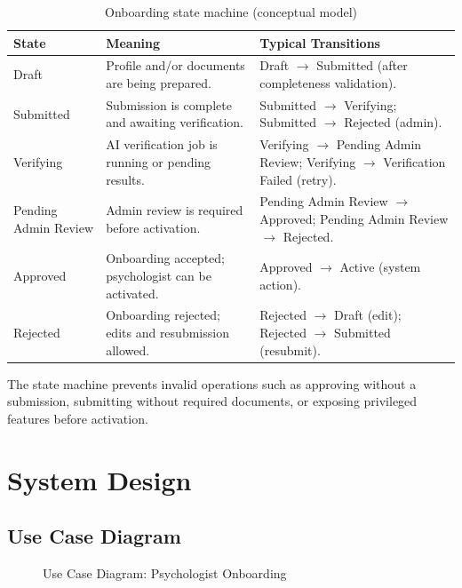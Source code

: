 \begin{table}[H]
\centering
\begin{tabularx}{\textwidth}{|l|X|X|}
\hline
\rowcolor{medgray}
\textbf{State} & \textbf{Meaning} & \textbf{Typical Transitions} \\
\hline

Draft & Profile and/or documents are being prepared. &
Draft $\rightarrow$ Submitted (after completeness validation). \\ \hline

Submitted & Submission is complete and awaiting verification. &
Submitted $\rightarrow$ Verifying; Submitted $\rightarrow$ Rejected (admin). \\ \hline

Verifying & AI verification job is running or pending results. &
Verifying $\rightarrow$ Pending Admin Review; Verifying $\rightarrow$ Verification Failed (retry). \\ \hline

Pending Admin Review & Admin review is required before activation. &
Pending Admin Review $\rightarrow$ Approved; Pending Admin Review $\rightarrow$ Rejected. \\ \hline

Approved & Onboarding accepted; psychologist can be activated. &
Approved $\rightarrow$ Active (system action). \\ \hline

Rejected & Onboarding rejected; edits and resubmission allowed. &
Rejected $\rightarrow$ Draft (edit); Rejected $\rightarrow$ Submitted (resubmit). \\ \hline

\end{tabularx}
\caption{Onboarding state machine (conceptual model)}
\end{table}

The state machine prevents invalid operations such as approving without a
submission, submitting without required documents, or exposing privileged
features before activation.

\section{System Design}
\label{sec:sprint2-design}

\subsection{Use Case Diagram}
\begin{figure}[H]
\centering
{}
\caption{Use Case Diagram: Psychologist Onboarding}
\end{figure}

